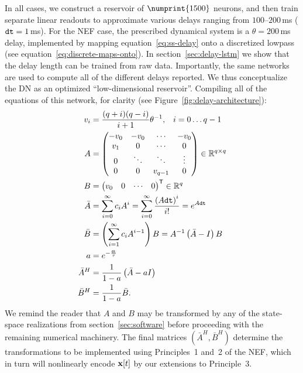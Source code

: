 In all cases, we construct a reservoir of $\numprint{1500}$ neurons, and then train separate linear readouts to approximate various delays ranging from $100$--$200$\,ms ($\texttt{dt}{} = 1$\,ms).
For the NEF case, the prescribed dynamical system is a $\theta = 200$\,ms delay, implemented by mapping equation~\ref{eq:ss-delay} onto a discretized lowpass (see equation~\ref{eq:discrete-maps-onto}).
In section~\ref{sec:delay-lstm} we show that the delay length can be trained from raw data.
Importantly, the same networks are used to compute all of the different delays reported.
We thus conceptualize the DN as an optimized ``low-dimensional reservoir''.
Compiling all of the equations of this network, for clarity (see Figure~\ref{fig:delay-architecture}):
\begin{equation} \label{eq:delay-compiled}
\begin{aligned}
v_i &= \frac{(q+i)(q-i)}{i+1} \theta^{-1} \text{,} \quad i = 0 \ldots q-1 \\
A &= \begin{pmatrix} -v_0 & -v_0 & \cdots & -v_0 \\ v_1 & 0 & \cdots & 0 \\ 0 & \ddots & \ddots & \vdots \\ 0 & 0 & v_{q-1} & 0\end{pmatrix} \in \mathbb{R}^{q \times q} \\
B &= {\begin{pmatrix} v_0 & 0 & \cdots & 0\end{pmatrix}}^\mathsf{T} \in \mathbb{R}^{q} \\
\bar{A} &= \sum_{i=0}^\infty c_i A^i = \sum_{i=0}^\infty \frac{\left(A\texttt{dt}{}\right)^i}{i!} = e^{A\texttt{dt}{}}  \\
\bar{B} &= \left( \sum_{i=1}^\infty c_i A^{i-1} \right) B = A^{-1} \left(\bar{A} - I\right) B  \\
a &= e^{-\frac{\texttt{dt}{}}{\tau}} \\
\bar{A}^H &= \frac{1}{1 - a} \left(\bar{A} - aI\right) \\
\bar{B}^H &= \frac{1}{1-a}\bar{B} \text{.}
\end{aligned}
\end{equation}
We remind the reader that $A$ and $B$ may be transformed by any of the state-space realizations from section~\ref{sec:software} before proceeding with the remaining numerical machinery.
The final matrices $(\bar{A}^H\text{,}\, \bar{B}^H)$ determine the transformations to be implemented using Principles~1 and~2 of the NEF, which in turn will nonlinearly encode $\mathbf{x}[t]$ by our extensions to Principle~3.

